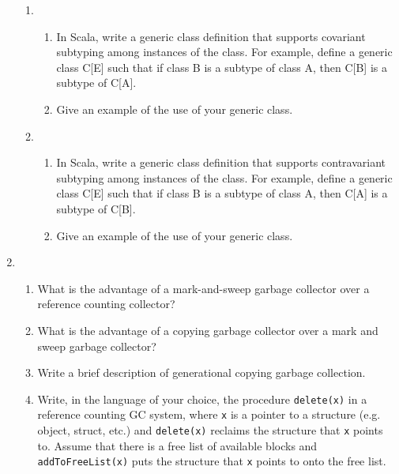 \documentclass[11pt]{article}
\begin{document}
\begin{enumerate}
\begin{enumerate}
\item 
\begin{enumerate}
\item In Scala, write a generic class definition that supports  covariant subtyping
among instances of the class.  For example, define a generic class C[E] such that
if class B is a subtype of class A, then C[B] is a subtype of C[A].


\item Give an example of the use of your generic class.


\end{enumerate} 

\item 
\begin{enumerate} 
\item  In Scala, write a generic class definition that supports contravariant subtyping
among instances of the class.  For example, define a generic class C[E] such that
if class B is a subtype of class A, then C[A] is a subtype of C[B].


\item Give an example of the use of your generic class.

\end{enumerate} 
\end{enumerate} 

\item 
\begin{enumerate} 
\item What is the advantage of a mark-and-sweep garbage collector over a reference counting collector?

\item What is the advantage of a copying garbage collector over a mark and sweep garbage collector?

\item Write a brief description of generational copying garbage collection.

\item Write, in the language of your choice, the procedure {\tt delete(x)} in a reference counting
GC system, where {\tt x} is a pointer to a structure (e.g. object, struct, etc.) and {\tt delete(x)} 
reclaims the structure that {\tt x} points to.  Assume that there is a free list of available blocks
and \mbox{\tt addToFreeList(x)} puts the structure that {\tt x} points to onto the free list.

\end{enumerate} 

\end{enumerate} 
\end{document}
